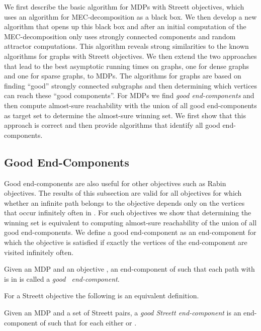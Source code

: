 \documentclass[11pt,letterpaper]{article}
\newif\iffullversion
\newcommand{\infull}[1]{\iffullversion #1\fi}
\begin{document}
We first describe the basic algorithm for MDPs with Streett objectives, which 
uses an algorithm for MEC-decomposition as a black box. We then develop a new 
algorithm that opens up this black box and after an initial computation of the 
MEC-decomposition only uses strongly connected components
and random attractor computations\infull{ (Section~\ref{sec:streettimpr})}. 
This algorithm reveals strong similarities to the known algorithms for graphs 
with Streett objectives. We then extend the two approaches that lead to the best
asymptotic running times on graphs, one for dense 
graphs\infull{ (Section~\ref{sec:streettdense})} 
and one for sparse\infull{ (Section~\ref{sec:streettdense})}
graphs, to MDPs. The algorithms for graphs are based on finding
``good'' strongly connected subgraphs and then determining which vertices can
reach these ``good components''. For MDPs we find \emph{good end-components}
and then compute almost-sure reachability with the union of all good 
end-components as target set
to determine the almost-sure winning set.
We first show that this approach is correct\infull{ 
(Section~\ref{sec:gec}, see also~\cite[Chap.~10.6.3]{baierbook})}
and then provide algorithms that identify all good end-components.

\subsection{Good End-Components}\label{sec:gec}

Good end-components are also useful for other objectives such as Rabin objectives.
The results of this subsection are valid for all objectives for which whether
an infinite path  belongs to the objective depends only on the vertices
 that occur infinitely often in .
For such objectives we show that determining the winning set is equivalent to 
computing almost-sure reachability of the union of all good end-components.
We define a good end-component as an end-component for which the objective
is satisfied if exactly the vertices of the end-component are visited infinitely
often.
\begin{definition}\label{def:good_ec}
  Given an MDP  and an objective ,
  an end-component  of  such that
  each path  with  is in 
  is called a \emph{good ~end-component}.
\end{definition}
For a Streett objective the following is an equivalent definition.
\begin{definition}
	Given an MDP  and a set  of
	Streett pairs, 
	a \emph{good Streett end-component} is an end-component  of  such that
	for each  either  or
	.
\end{definition}
\end{document}
